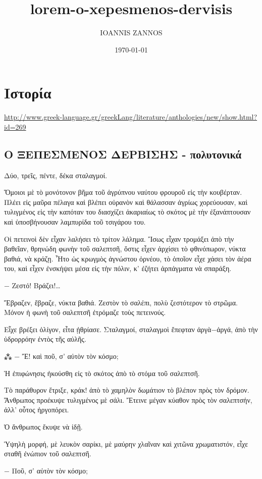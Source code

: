 \documentclass{article}
\author{IOANNIS ZANNOS}
\date{\today}
\title{lorem-o-xepesmenos-dervisis}
\begin{document}
\maketitle
\tableofcontents

\section{Ιστορία}
\label{sec-1}

\url{http://www.greek-language.gr/greekLang/literature/anthologies/new/show.html?id=269}

\subsection{Ο ΞΕΠΕΣΜΕΝΟΣ ΔΕΡΒΙΣΗΣ - πολυτονικά}
\label{sec-1-1}


Δύο, τρεῖς, πέντε, δέκα σταλαγμοί.

Ὅμοιοι μὲ τὸ μονότονον βῆμα τοῦ ἀγρύπνου ναύτου φρουροῦ εἰς τὴν κουβέρταν. Πλέει εἰς μαῦρα πέλαγα καὶ βλέπει οὐρανὸν καὶ θάλασσαν ἀγρίως χορεύουσαν, καὶ τυλιγμένος εἰς τὴν καπόταν του διασχίζει ἀκαριαίως τὸ σκότος μὲ τὴν ἐξανάπτουσαν καὶ ὑποσβήνουσαν λαμπυρίδα τοῦ τσιγάρου του.

Οἱ πετεινοὶ δὲν εἶχαν λαλήσει τὸ τρίτον λάλημα. Ἴσως εἶχαν τρομάξει ἀπὸ τὴν βαθεῖαν, θρηνώδη φωνὴν τοῦ σαλεπτσῆ, ὅστις εἶχεν ἀρχίσει τὸ φθινόπωρον, νύκτα βαθιά, νὰ κράζῃ. Ἦτο ὡς κρωγμὸς ἀγνώστου ὀρνέου, τὸ ὁποῖον εἶχε χάσει τὸν ἀέρα του, καὶ εἶχεν ἐνσκήψει μέσα εἰς τὴν πόλιν, κ' ἐζήτει ἁρπάγματα νὰ σπαράξη.

− Ζεστό! Βράζει!…

Ἔβραζεν, ἔβραζε, νύκτα βαθιά. Ζεστὸν τὸ σαλέπι, πολὺ ζεστότερον τὸ στρῶμα. Μόνον ἡ φωνὴ τοῦ σαλεπτσῆ ἐτρόμαζε τοὺς πετεινούς.

Εἶχε βρέξει ὀλίγον, εἶτα ᾐθρίασε. Σταλαγμοί, σταλαγμοὶ ἔπεφταν ἀργὰ−ἀργά, ἀπὸ τὴν ὑδρορρόην ἐντὸς τῆς αὐλῆς.

⁂
− Ἔ! καὶ ποῦ, σ' αὐτὸν τὸν κόσμο;

Ἡ ἐπιφώνησις ἠκούσθη εἰς τὸ σκότος ἀπὸ τὸ στόμα τοῦ σαλεπτσῆ.

Τὸ παράθυρον ἔτριξε, κράκ! ἀπὸ τὸ χαμηλὸν δωμάτιον τὸ βλέπον πρὸς τὸν δρόμον. Ἄνθρωπος προέκυψε τυλιγμένος μὲ σάλι. Ἔτεινε μέγαν κύαθον πρὸς τὸν σαλεπτσήν, ἀλλ' οὗτος ἠργοπόρει.

Ὁ ἄνθρωπος ἔκυψε νὰ ἰδῇ.

Ὑψηλὴ μορφή, μὲ λευκὸν σαρίκι, μὲ μαύρην χλαῖναν καὶ χιτῶνα χρωματιστόν, εἶχε σταθῆ ἐνώπιον τοῦ σαλεπτσῆ.

− Ποῦ, σ' αὐτὸν τὸν κόσμο;
\end{document}
